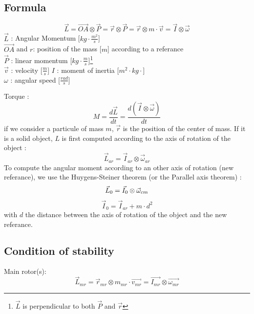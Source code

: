 \documentclass[12pt,a4paper]{article}
\begin{document}
	\subsection{Formula}
	\begin{equation}
		\vec{L}=\vec{OA} \otimes \vec{P}=\vec{r} \otimes \vec{P}=\vec{r} \otimes m \cdot \vec{v}=\vec{I} \otimes \vec{\omega}
	\end{equation}
	$\vec{L}$ : Angular Momentum [$kg \cdot \frac{m^2}{s}$]\\
	$\vec{OA}$ and $r$: position of the mass [$m$] according to a referance\\
	$\vec{P}$ : linear momentum [$kg\cdot \frac{m}{s}$]\footnote{$\vec{L}$ is perpendicular to both $\vec{P}$ and $\vec{r}$}\\
	$\vec{v}$ : velocity [$\frac{m}{s}$]
	$I$ : moment of inertia [$m^2 \cdot kg \cdot$]\\
	$\omega$ : angular speed [$\frac{rad}{s}$]
	
	Torque : 
	\begin{equation}
		M = \frac{d\vec{L}}{dt}=\frac{d(\vec{I} \otimes \vec{\omega})}{dt}
	\end{equation}
	\medbreak
	if we consider a particule of mass $m$, $\vec{r}$ is the position of the center of mass.
	If it is a solid object, $L$ is first computed according to the axis of rotation of the object : 
	\begin{equation}
		\vec{L}_{ar}=\vec{I}_{ar} \otimes \vec{\omega}_{ar}
	\end{equation}
	To compute the angular moment according to an other axis of rotation (new referance), we use the Huygens-Steiner theorem (or the Parallel axis theorem) : 
	\begin{equation}
		\vec{L}_{0}=\vec{I}_{0} \otimes \vec{\omega}_{cm}\\
	\end{equation}
	\begin{equation}
		\vec{I}_{0} = \vec{I}_{ar} + m\cdot d^2
	\end{equation}
	with $d$ the distance between the axis of rotation of the object and the new referance. 
	\subsection{Condition of stability}
	
	Main rotor(s):
	\begin{equation}
		\vec{L}_{mr}=\vec{r}_{mr} \otimes m_{mr} \cdot \vec{v_{mr}}=\vec{I_{mr}} \otimes \vec{\omega_{mr}}
	\end{equation}
	
\end{document}
